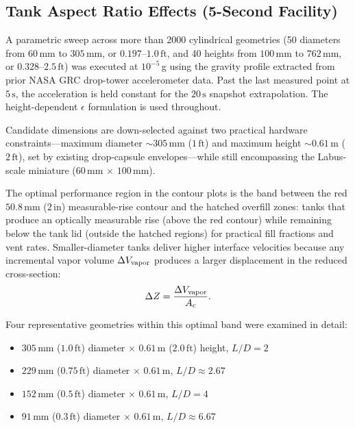 \documentclass[conf]{new-aiaa}
\begin{document}
\subsection{Tank Aspect Ratio Effects (5-Second Facility)}
A parametric sweep across more than 2000 cylindrical geometries (50 diameters from $60\,\text{mm}$ to $305\,\text{mm}$, or $0.197$--$1.0\,\text{ft}$, and 40 heights from $100\,\text{mm}$ to $762\,\text{mm}$, or $0.328$--$2.5\,\text{ft}$) was executed at $10^{-5}\,$g using the gravity profile extracted from prior NASA GRC drop-tower accelerometer data. Past the last measured point at $5\,\text{s}$, the acceleration is held constant for the $20\,\text{s}$ snapshot extrapolation. The height-dependent $\epsilon$ formulation is used throughout.

Candidate dimensions are down-selected against two practical hardware constraints---maximum diameter $\sim 305\,\text{mm}$ ($1\,\text{ft}$) and maximum height $\sim 0.61\,\text{m}$ ($2\,\text{ft}$), set by existing drop-capsule envelopes---while still encompassing the Labus-scale miniature ($60\,\text{mm}$ $\times$ $100\,\text{mm}$).

The optimal performance region in the contour plots is the band between the red $50.8\,\text{mm}$ ($2\,\text{in}$) measurable-rise contour and the hatched overfill zones: tanks that produce an optically measurable rise (above the red contour) while remaining below the tank lid (outside the hatched regions) for practical fill fractions and vent rates. Smaller-diameter tanks deliver higher interface velocities because any incremental vapor volume $\Delta V_{\rm vapor}$ produces a larger displacement in the reduced cross-section:
\[
\Delta Z = \frac{\Delta V_{\rm vapor}}{A_c}.
\]

Four representative geometries within this optimal band were examined in detail:
\begin{itemize}
    \item $305\,\text{mm}$ ($1.0\,\text{ft}$) diameter $\times$ $0.61\,\text{m}$ ($2.0\,\text{ft}$) height, $L/D = 2$
    \item $229\,\text{mm}$ ($0.75\,\text{ft}$) diameter $\times$ $0.61\,\text{m}$, $L/D \approx 2.67$
    \item $152\,\text{mm}$ ($0.5\,\text{ft}$) diameter $\times$ $0.61\,\text{m}$, $L/D = 4$
    \item $91\,\text{mm}$ ($0.3\,\text{ft}$) diameter $\times$ $0.61\,\text{m}$, $L/D \approx 6.67$
\end{itemize}
\end{document}
